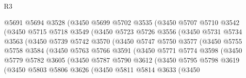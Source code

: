 \begin{lexlean}{R3}
\begin{coremodule}
                    @5691
                    @5694
                    @3528
                    (@3450
                      @5699
                      @5702
                      @3535
                      (@3450
                        @5707
                        @5710
                        @3542
                        (@3450
                          @5715
                          @5718
                          @3549
                          (@3450
                            @5723
                            @5726
                            @3556
                            (@3450
                              @5731
                              @5734
                              @3563
                              (@3450
                                @5739
                                @5742
                                @3570
                                (@3450
                                  @5747
                                  @5750
                                  @3577
                                  (@3450
                                    @5755
                                    @5758
                                    @3584
                                    (@3450
                                      @5763
                                      @5766
                                      @3591
                                      (@3450
                                        @5771
                                        @5774
                                        @3598
                                        (@3450
                                          @5779
                                          @5782
                                          @3605
                                          (@3450
                                            @5787
                                            @5790
                                            @3612
                                            (@3450
                                              @5795
                                              @5798
                                              @3619
                                              (@3450
                                                @5803
                                                @5806
                                                @3626
                                                (@3450
                                                  @5811
                                                  @5814
                                                  @3633
                                                  (@3450

\end{coremodule}
\end{lexlean}

